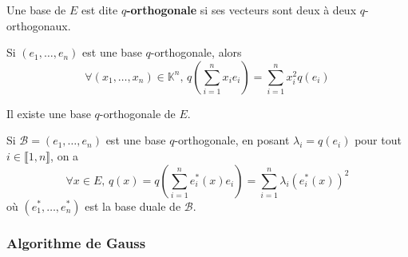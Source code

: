 
  \begin{definition}
    Une base de $E$ est dite \textbf{$q$-orthogonale} si ses vecteurs sont deux à deux $q$-orthogonaux.
  \end{definition}

  \begin{remark}
    Si $(e_1, \dots, e_n)$ est une base $q$-orthogonale, alors
    \[ \forall (x_1, \dots, x_n) \in \mathbb{K}^n, \, q \left( \sum_{i=1}^n x_i e_i \right) = \sum_{i=1}^n x_i^2 q(e_i) \]
  \end{remark}

  \begin{theorem}
    Il existe une base $q$-orthogonale de $E$.
  \end{theorem}

  \begin{remark}
    Si $\mathcal{B} = (e_1, \dots, e_n)$ est une base $q$-orthogonale, en posant $\lambda_i = q(e_i)$ pour tout $i \in \llbracket 1, n \rrbracket$, on a
    \[ \forall x \in E, \, q(x) = q \left( \sum_{i=1}^n e_i^*(x) e_i \right) = \sum_{i=1}^n \lambda_i (e_i^*(x))^2 \]
    où $(e_1^*, \dots, e_n^*)$ est la base duale de $\mathcal{B}$.
  \end{remark}

  \subsubsection{Algorithme de Gauss}

